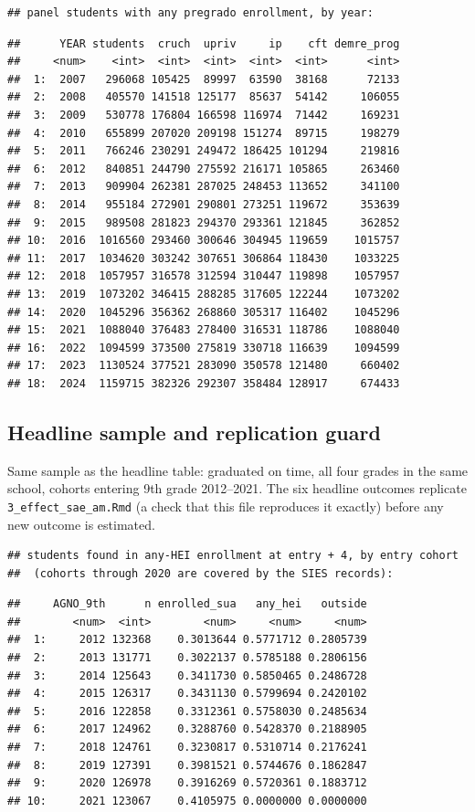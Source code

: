\documentclass[
]{article}
\begin{document}
\begin{verbatim}
## panel students with any pregrado enrollment, by year:
\end{verbatim}

\begin{verbatim}
##      YEAR students  cruch  upriv     ip    cft demre_prog
##     <num>    <int>  <int>  <int>  <int>  <int>      <int>
##  1:  2007   296068 105425  89997  63590  38168      72133
##  2:  2008   405570 141518 125177  85637  54142     106055
##  3:  2009   530778 176804 166598 116974  71442     169231
##  4:  2010   655899 207020 209198 151274  89715     198279
##  5:  2011   766246 230291 249472 186425 101294     219816
##  6:  2012   840851 244790 275592 216171 105865     263460
##  7:  2013   909904 262381 287025 248453 113652     341100
##  8:  2014   955184 272901 290801 273251 119672     353639
##  9:  2015   989508 281823 294370 293361 121845     362852
## 10:  2016  1016560 293460 300646 304945 119659    1015757
## 11:  2017  1034620 303242 307651 306864 118430    1033225
## 12:  2018  1057957 316578 312594 310447 119898    1057957
## 13:  2019  1073202 346415 288285 317605 122244    1073202
## 14:  2020  1045296 356362 268860 305317 116402    1045296
## 15:  2021  1088040 376483 278400 316531 118786    1088040
## 16:  2022  1094599 373500 275819 330718 116639    1094599
## 17:  2023  1130524 377521 283090 350578 121480     660402
## 18:  2024  1159715 382326 292307 358484 128917     674433
\end{verbatim}

\hypertarget{headline-sample-and-replication-guard}{%
\subsection{Headline sample and replication
guard}\label{headline-sample-and-replication-guard}}

Same sample as the headline table: graduated on time, all four grades in
the same school, cohorts entering 9th grade 2012--2021. The six headline
outcomes replicate \texttt{3\_effect\_sae\_am.Rmd} (a check that this
file reproduces it exactly) before any new outcome is estimated.

\begin{verbatim}
## students found in any-HEI enrollment at entry + 4, by entry cohort
##  (cohorts through 2020 are covered by the SIES records):
\end{verbatim}

\begin{verbatim}
##     AGNO_9th      n enrolled_sua   any_hei   outside
##        <num>  <int>        <num>     <num>     <num>
##  1:     2012 132368    0.3013644 0.5771712 0.2805739
##  2:     2013 131771    0.3022137 0.5785188 0.2806156
##  3:     2014 125643    0.3411730 0.5850465 0.2486728
##  4:     2015 126317    0.3431130 0.5799694 0.2420102
##  5:     2016 122858    0.3312361 0.5758030 0.2485634
##  6:     2017 124962    0.3288760 0.5428370 0.2188905
##  7:     2018 124761    0.3230817 0.5310714 0.2176241
##  8:     2019 127391    0.3981521 0.5744676 0.1862847
##  9:     2020 126978    0.3916269 0.5720361 0.1883712
## 10:     2021 123067    0.4105975 0.0000000 0.0000000
\end{verbatim}
\end{document}
